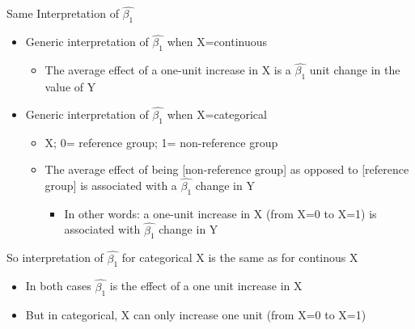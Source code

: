 \documentclass[
  8pt,
  ignorenonframetext,
  dvipsnames]{beamer}
\providecommand{\tightlist}{%
  \setlength{\itemsep}{0pt}\setlength{\parskip}{0pt}}
\let\olditem\item
\renewcommand{\item}{%
  \olditem\vspace{4pt}
}
\begin{document}
\begin{frame}{Same Interpretation of \(\hat{\beta_1}\)}
\protect\hypertarget{same-interpretation-of-hatbeta_1}{}

\begin{itemize}
\tightlist
\item
  Generic interpretation of \(\hat{\beta_1}\) when X=continuous

  \begin{itemize}
  \tightlist
  \item
    The average effect of a one-unit increase in X is a
    \(\hat{\beta_1}\) unit change in the value of Y
  \end{itemize}
\item
  Generic interpretation of \(\hat{\beta_1}\) when X=categorical

  \begin{itemize}
  \tightlist
  \item
    X; 0= reference group; 1= non-reference group
  \item
    The average effect of being {[}non-reference group{]} as opposed to
    {[}reference group{]} is associated with a \(\hat{\beta_1}\) change
    in Y

    \begin{itemize}
    \tightlist
    \item
      In other words: a one-unit increase in X (from X=0 to X=1) is
      associated with \(\hat{\beta_1}\) change in Y
    \end{itemize}
  \end{itemize}
\end{itemize}

\medskip

So interpretation of \(\hat{\beta_1}\) for categorical X is the same as
for continous X

\begin{itemize}
\tightlist
\item
  In both cases \(\hat{\beta_1}\) is the effect of a one unit increase
  in X
\item
  But in categorical, X can only increase one unit (from X=0 to X=1)
\end{itemize}

\end{frame}
\end{document}
